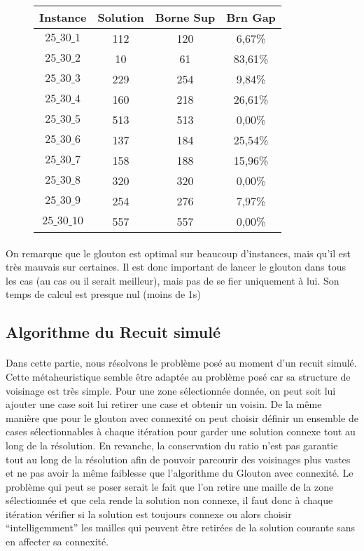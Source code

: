 \documentclass[a4paper, 11pt]{article} %
\begin{document}
\begin{center}
\begin{figure}[H]
      \begin{tabular}{|c|c|c|c|}
      \hline 
        Instance & Solution & Borne Sup & Brn Gap  \\ \hline
$25\_30\_1$ & 112 &  120 &  6,67\% \\ \hline
$25\_30\_2$ & 10 &   61 &   83,61\% \\ \hline
$25\_30\_3$ & 229 &  254 &  9,84\% \\ \hline
$25\_30\_4$ & 160 &  218 &  26,61\% \\ \hline
$25\_30\_5$ & 513 &  513 &  0,00\% \\ \hline
$25\_30\_6$ & 137 &  184 &  25,54\% \\ \hline
$25\_30\_7$ & 158 &  188 &  15,96\% \\ \hline
$25\_30\_8$ & 320 &  320 &  0,00\% \\ \hline
$25\_30\_9$ & 254 &  276 &  7,97\% \\ \hline
$25\_30\_10$ &557 &  557 &  0,00\% \\ \hline
      \end{tabular}
\end{figure}
\end{center}

\paragraph*{}
On remarque que le glouton est optimal sur beaucoup d'instances, mais qu'il est très mauvais sur certaines. Il est donc important de lancer le glouton dans tous les cas (au cas ou il serait meilleur), mais pas de se fier uniquement à lui. Son temps de calcul est presque nul (moins de 1s)

\subsection{Algorithme du Recuit simulé}

\paragraph{}
Dans cette partie, nous résolvons le problème posé au moment d'un recuit simulé. Cette métaheuristique semble être adaptée au problème posé car sa structure de voisinage est très simple. Pour une zone sélectionnée donnée, on peut soit lui ajouter une case soit lui retirer une case et obtenir un voisin. De la même manière que pour le glouton avec connexité on peut choisir définir un ensemble de cases sélectionnables à chaque itération pour garder une solution connexe tout au long de la résolution. En revanche, la conservation du ratio n'est pas garantie tout au long de la résolution afin de pouvoir parcourir des voisinages plus vastes et ne pas avoir la même faiblesse que l'algorithme du Glouton avec connexité. Le problème qui peut se poser serait le fait que l'on retire une maille de la zone sélectionnée et que cela rende la solution non connexe, il faut donc à chaque itération vérifier si la solution est toujours connexe ou alors choisir ``intelligemment'' les mailles qui peuvent être retirées de la solution courante sans en affecter sa connexité.
\end{document}
